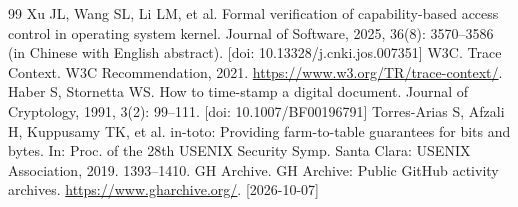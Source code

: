 {\begin{thebibliography}{99}
 Xu JL, Wang SL, Li LM, et al. Formal verification of capability-based access control in operating system kernel. Journal of Software, 2025, 36(8): 3570--3586 (in Chinese with English abstract). [doi: 10.13328/j.cnki.jos.007351]
 W3C. Trace Context. W3C Recommendation, 2021. \url{https://www.w3.org/TR/trace-context/}.
 Haber S, Stornetta WS. How to time-stamp a digital document. Journal of Cryptology, 1991, 3(2): 99--111. [doi: 10.1007/BF00196791]
 Torres-Arias S, Afzali H, Kuppusamy TK, et al. in-toto: Providing farm-to-table guarantees for bits and bytes. In: Proc. of the 28th USENIX Security Symp. Santa Clara: USENIX Association, 2019. 1393--1410.
 GH Archive. GH Archive: Public GitHub activity archives. \url{https://www.gharchive.org/}. [2026-10-07]
\end{thebibliography}
}
